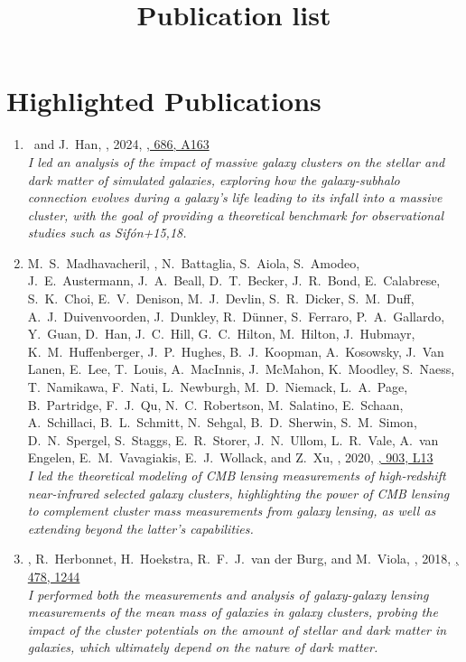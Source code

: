
\title{Publication list}

\noindent


\section*{Highlighted Publications}

\begin{enumerate}

\item
\myself\ and J.~Han,
,
2024, \href{https://ui.adsabs.harvard.edu/abs/2024A&A...686A.163S}{\aap, 686, A163}
\\\noindent\textit{I led an analysis of the impact of massive galaxy clusters on the stellar and dark matter of simulated galaxies, exploring how the galaxy-subhalo connection evolves during a galaxy's life leading to its infall into a massive cluster, with the goal of providing a theoretical benchmark for observational studies such as Sifón+15,18.}

\item
M.~S.~Madhavacheril, \myself, N.~Battaglia, S.~Aiola, S.~Amodeo, J.~E.~Austermann, J.~A.~Beall, D.~T.~Becker, J.~R.~Bond, E.~Calabrese, S.~K.~Choi, E.~V.~Denison, M.~J.~Devlin, S.~R.~Dicker, S.~M.~Duff, A.~J.~Duivenvoorden, J.~Dunkley, R.~Dünner, S.~Ferraro, P.~A.~Gallardo, Y.~Guan, D.~Han, J.~C.~Hill, G.~C.~Hilton, M.~Hilton, J.~Hubmayr, K.~M.~Huffenberger, J.~P.~Hughes, B.~J.~Koopman, A.~Kosowsky, J.~Van Lanen, E.~Lee, T.~Louis, A.~MacInnis, J.~McMahon, K.~Moodley, S.~Naess, T.~Namikawa, F.~Nati, L.~Newburgh, M.~D.~Niemack, L.~A.~Page, B.~Partridge, F.~J.~Qu, N.~C.~Robertson, M.~Salatino, E.~Schaan, A.~Schillaci, B.~L.~Schmitt, N.~Sehgal, B.~D.~Sherwin, S.~M.~Simon, D.~N.~Spergel, S.~Staggs, E.~R.~Storer, J.~N.~Ullom, L.~R.~Vale, A.~van Engelen, E.~M.~Vavagiakis, E.~J.~Wollack, and Z.~Xu,
,
2020, \href{https://ui.adsabs.harvard.edu/abs/2020ApJ...903L..13M}{\apjl, 903, L13}
\\\noindent\textit{I led the theoretical modeling of CMB lensing measurements of high-redshift near-infrared selected galaxy clusters, highlighting the power of CMB lensing to complement cluster mass measurements from galaxy lensing, as well as extending beyond the latter's capabilities.}

\item
\myself, R.~Herbonnet, H.~Hoekstra, R.~F.~J.~van der Burg, and M.~Viola,
,
2018, \href{https://ui.adsabs.harvard.edu/abs/2018MNRAS.478.1244S}{\mnras, 478, 1244}
\\\noindent\textit{I performed both the measurements and analysis of galaxy-galaxy lensing measurements of the mean mass of galaxies in galaxy clusters, probing the impact of the cluster potentials on the amount of stellar and dark matter in galaxies, which ultimately depend on the nature of dark matter.}

\end{enumerate}
